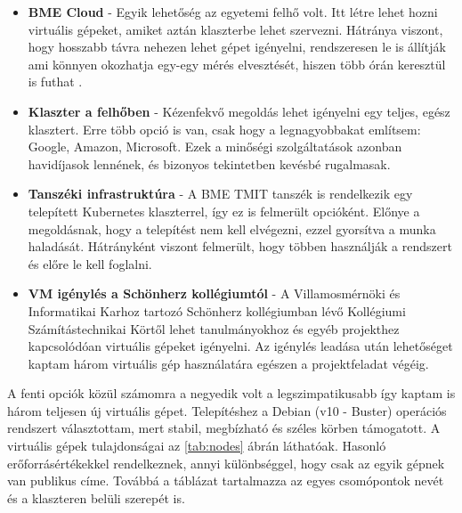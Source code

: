 \begin{itemize}
 	\item \textbf{BME Cloud} - Egyik lehetőség az egyetemi felhő volt. 
 	Itt létre lehet hozni virtuális gépeket, amiket aztán klaszterbe lehet szervezni.
 	Hátránya viszont, hogy hosszabb távra nehezen lehet gépet igényelni, rendszeresen le is állítják ami könnyen okozhatja egy-egy mérés elvesztését, hiszen több órán keresztül is futhat
 	.
	\item \textbf{Klaszter a felhőben} - Kézenfekvő megoldás lehet igényelni egy teljes, egész klasztert. 
	Erre több opció is van, csak hogy a legnagyobbakat említsem: Google, Amazon, Microsoft.
	Ezek a minőségi szolgáltatások azonban havidíjasok lennének, és bizonyos tekintetben kevésbé rugalmasak. 
	 
    \item \textbf{Tanszéki infrastruktúra} - A BME TMIT tanszék is rendelkezik egy telepített Kubernetes klaszterrel, így ez is felmerült opcióként.
    Előnye a megoldásnak, hogy a telepítést nem kell elvégezni, ezzel gyorsítva a munka haladását.
    Hátrányként viszont felmerült, hogy többen használják a rendszert és előre le kell foglalni.

      \item \textbf{VM igénylés a Schönherz kollégiumtól} - A Villamosmérnöki és Informatikai Karhoz tartozó Schönherz kollégiumban lévő Kollégiumi Számítástechnikai Körtől lehet tanulmányokhoz és egyéb projekthez kapcsolódóan virtuális gépeket igényelni. 
      Az igénylés leadása után lehetőséget kaptam három virtuális gép használatára egészen a projektfeladat végéig.
      
\end{itemize}		

A fenti opciók közül számomra a negyedik volt a legszimpatikusabb így kaptam is három teljesen új virtuális gépet. Telepítéshez a Debian (v10 - Buster) operációs rendszert választottam, mert stabil, megbízható és széles körben támogatott. A virtuális gépek tulajdonságai az \ref{tab:nodes} ábrán láthatóak. Hasonló erőforrásértékekkel rendelkeznek, annyi különbséggel, hogy csak az egyik gépnek van publikus címe. Továbbá a táblázat tartalmazza az egyes csomópontok nevét és a klaszteren belüli szerepét is.


